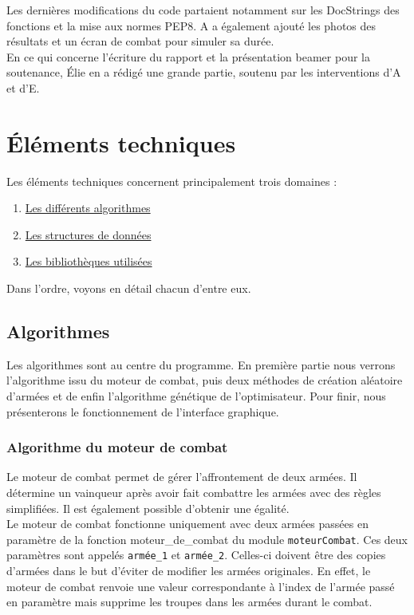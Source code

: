 \documentclass[a4paper]{article} %
\begin{document}
Les dernières modifications du code partaient notamment sur les DocStrings des fonctions et la mise aux normes PEP8. A a également ajouté les photos des résultats et un écran de combat pour simuler sa durée.\\

En ce qui concerne l'écriture du rapport et la présentation beamer pour la soutenance, Élie en a rédigé une grande partie, soutenu par les interventions d'A et d'E.

\section{Éléments techniques}
Les éléments techniques concernent principalement trois domaines :
\begin{enumerate}
	\item \hyperref[Algorithmes]{Les différents algorithmes}
	\item \hyperref[structureDonnees]{Les structures de données}
	\item \hyperref[bibliothèques]{Les bibliothèques utilisées}
\end{enumerate}

Dans l'ordre, voyons en détail chacun d'entre eux.

	\subsection{Algorithmes}\label{Algorithmes}
Les algorithmes sont au centre du programme. En première partie nous verrons l'algorithme issu du moteur de combat, puis deux méthodes de création aléatoire d'armées et de enfin l'algorithme génétique de l'optimisateur. Pour finir, nous présenterons le fonctionnement  de l'interface graphique.

		\subsubsection{Algorithme du moteur de combat}\label{moteurCombat}
Le moteur de combat permet de gérer l'affrontement de deux armées. Il détermine un vainqueur après avoir fait combattre les armées avec des règles simplifiées. Il est également possible d'obtenir une égalité.
\\
Le moteur de combat fonctionne uniquement avec deux armées passées en paramètre de la fonction moteur\_de\_combat du module \texttt{moteurCombat}. Ces deux paramètres sont appelés \texttt{armée\_1} et  \texttt{armée\_2}. Celles-ci doivent être des copies d'armées dans le but d'éviter de modifier les armées originales. En effet, le moteur de combat renvoie une valeur correspondante à l'index de l'armée passé en paramètre mais supprime les troupes dans les armées durant le combat.
\end{document}
